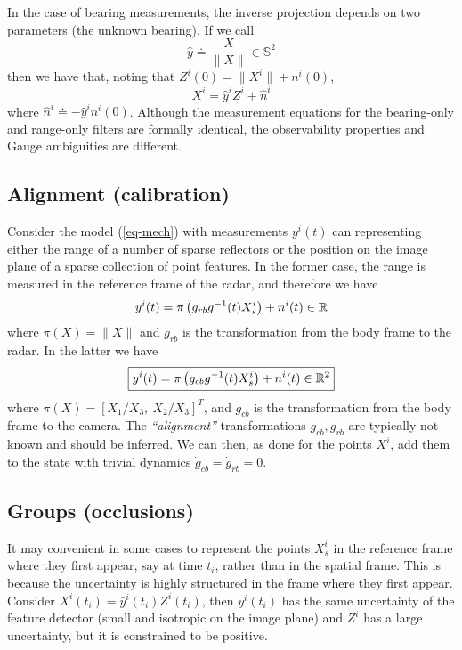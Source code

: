In the case of bearing measurements, the inverse projection depends on two parameters (the unknown bearing). If we call 
\begin{equation}
\hat y \doteq \frac{X}{\| X \|} \in {\mathbb S}^2
\end{equation}
then we have that, noting that $Z^i(0) = \| X^i \| + n^i(0)$, 
\begin{equation}
X^i = {\hat y}^i Z^i + {\hat n}^i
\label{eq-ran-tri}
\end{equation}
where ${\hat n}^i \doteq - {\hat y}^i n^i(0)$. Although the measurement equations for the bearing-only and range-only filters are formally identical, the observability properties and Gauge ambiguities are different. 

\subsection{Alignment (calibration)} 

Consider the model (\ref{eq-mech}) with measurements $y^i(t)$ can representing either the range of a number of sparse reflectors or the position on the image plane of a sparse collection of point features. In the former case, the range is measured in the reference frame of the radar, and therefore we have 
\begin{equation}
y^i(t) = \pi\left( g_{rb} g^{-1}(t) X_s^i \right) + n^i(t) \in \mathbb{R}
\end{equation}
where $\pi(X) = \| X \|$ and $g_{rb}$ is the transformation from the body frame to the radar. In the latter we have 
\begin{equation}
\boxed{y^i(t) = \pi\left( g_{cb} g^{-1}(t) X_s^i \right) + n^i(t) \in \mathbb{R}^2}
\end{equation}
where $\pi(X) = [X_1/X_3, \ X_2/X_3]^T$, and $g_{cb}$ is the transformation from the body frame to the camera. The {\em ``alignment''} transformations $g_{cb}, g_{rb}$ are typically not known and should be inferred. We can then, as done for the points $X^i$, add them to the state with trivial dynamics $\dot g_{cb} = \dot g_{rb} = 0$.

\subsection{Groups (occlusions)}

It may convenient in some cases to represent the points $X_s^i$ in the reference frame where they first appear, say at time $t_i$, rather than in the spatial frame. This is because the uncertainty is highly structured in the frame where they first appear. 
Consider $X^i(t_i) = \bar y^i(t_i) Z^i(t_i)$, then $y^i(t_i)$ has the same uncertainty of the feature detector (small and isotropic on the image plane) and $Z^i$ has a large uncertainty, but it is constrained to be positive. 

